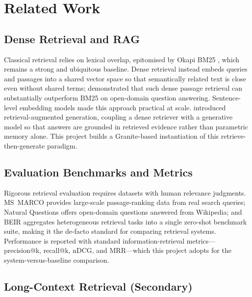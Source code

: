 \section{Related Work}

\subsection{Dense Retrieval and RAG}

Classical retrieval relies on lexical overlap, epitomised by Okapi BM25
\parencite{robertson2009bm25}, which remains a strong and ubiquitous baseline.
Dense retrieval instead embeds queries and passages into a shared vector space
so that semantically related text is close even without shared terms;
\textcite{karpukhin2020dpr} demonstrated that such dense passage retrieval can
substantially outperform BM25 on open-domain question answering. Sentence-level
embedding models \parencite{reimers2019sbert} made this approach practical at
scale. \textcite{lewis2020rag} introduced retrieval-augmented generation, coupling
a dense retriever with a generative model so that answers are grounded in
retrieved evidence rather than parametric memory alone. This project builds a
Granite-based instantiation of this retrieve-then-generate paradigm.

\subsection{Evaluation Benchmarks and Metrics}

Rigorous retrieval evaluation requires datasets with human relevance judgments.
MS~MARCO \parencite{nguyen2016msmarco} provides large-scale passage-ranking data
from real search queries; Natural Questions \parencite{kwiatkowski2019nq} offers
open-domain questions answered from Wikipedia; and BEIR
\parencite{thakur2021beir} aggregates heterogeneous retrieval tasks into a single
zero-shot benchmark suite, making it the de-facto standard for comparing
retrieval systems. Performance is reported with standard
information-retrieval metrics---precision@k, recall@k, nDCG, and MRR---which this
project adopts for the system-versus-baseline comparison.

\subsection{Long-Context Retrieval (Secondary)}

